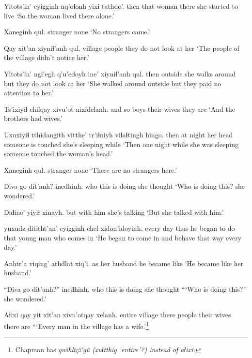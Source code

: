 \documentclass[12pt]{article}
\begin{document}
\gll Yitots'in' eyigginh nq'oɬonh yixi tathdo'.
then  that  woman  there {she started to live}
\glt `So the woman lived there alone.'
\glend

\gll Xaneginh qul.
stranger none
\glt `No strangers came.'
\glend

\gll Qay xit'an {xiyniɬ'anh qul.}
village people {they do not look at her}
\glt `The people of the village didn't notice her.'
\glend

\gll Yitots'in' ngi'egh q'u'edoyh ine' {xiyniɬ'anh qul.}
then  outside {she walks around} but {they do not look at her}
\glt `She walked around outside but they paid no attention to her.'
\glend

\gll Ts'ixiyiɬ chilqay xivu'ot nixidelanh.
{and so} boys  {their wives} {they are}
\glt `And the brothers had wives.'
\glend

\gll Uxuxiyiɬ tthidangith vitthe' tr'iɬniyh  viɬaɬtingh hingo.
then {at night} {her head} {someone is touched} {she's sleeping} while
\glt `Then one night while she was sleeping someone touched the woman's head.'
\glend

\gll Xaneginh qul.
stranger none
\glt `There are no strangers here.'
\glend

\gll Diva go dit'anh? inedhinh.
who this {is doing}  {she thought}
\glt `Who is doing this? she wondered.'
\glend

\gll Daɬine' yiyiɬ  xinayh.
but {with him} {she's talking}
\glt `But she talked with him.'
\glend

 yuxudz dititht'an'  eyigginh chel  xidon'idoyinh.
{every day}  thus  {he began to do}  that  {young man} {who comes in}
\glt `He began to come in and behave that way every day.'
\glend

\gll Anhtr'a viqing' athdlat xiq'i.
as {her husband} {he became} like
\glt `He became like her husband.'
\glend

\gll ``Diva  go dit'anh?'' inedhinh.
who this {is doing}  {she thought}
\glt ```Who is doing this?'' she wondered.'
\glend

\gll Aɬixi qay yit xit'an xivu'otqay xelanh.
entire village there people  {their wives} {there are}
\glt ```Every man in the village has a wife.'\footnote{Chapman has \em qw\u{\i}hlt\c{c}\u{\i}\'{}g\^{u} (xuɬtthig `entire'?) \em instead of \em aɬixi.}
\glend
\end{document}
